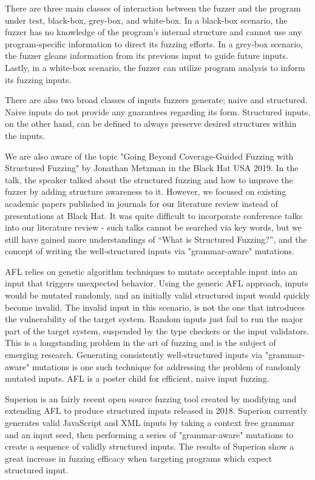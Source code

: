 \documentclass[12pt]{diazessay}
\begin{document}
There are three main classes of interaction between the fuzzer and the program under test, black-box\cite{takanen2018fuzzing}, grey-box, and white-box\cite{fuzzingsurvey}.
In a black-box scenario, the fuzzer has no knowledge of the program's internal structure and cannot use any program-specific information to direct its fuzzing efforts.
In a grey-box scenario, the fuzzer gleans information from its previous input to guide future inputs.
Lastly, in a white-box scenario, the fuzzer can utilize program analysis to inform its fuzzing inputs.

There are also two broad classes of inputs fuzzers generate; naive and structured\cite{fuzzingsurvey}.
Naive inputs do not provide any guarantees regarding its form.
Structured inputs, on the other hand, can be defined to always preserve desired structures within the inputs.

We are also aware of the topic "Going Beyond Coverage-Guided Fuzzing with Structured Fuzzing" by Jonathan Metzman in the Black Hat USA 2019\cite{blackhat2019}.
In the talk, the speaker talked about the structured fuzzing and how to improve the fuzzer by adding structure awareness to it. 
However, we focused on existing academic papers published in journals for our literature review instead of presentations at Black Hat.
It was quite difficult to incorporate conference talks into our literature review - such talks cannot be searched via key words, but we still have gained more understandings of “What is Structured Fuzzing?”, and the concept of writing the well-structured inputs via "grammar-aware" mutations.

AFL\cite{AFL_page} relies on genetic algorithm techniques\cite{InputMutationAlgorithm} to mutate acceptable input into an input that triggers unexpected behavior.
Using the generic AFL approach, inputs would be mutated randomly, and an initially valid structured input would quickly become invalid.
The invalid input in this scenario, is not the one that introduces the vulnerability of the target system.
Random inputs just fail to run the major part of the target system, suspended by the type checkers or the input validators.
This is a longstanding problem in the art of fuzzing and is the subject of emerging research.
Generating consistently well-structured inputs\cite{structuredInput} via "grammar-aware" mutations is one such technique for addressing the problem of randomly mutated inputs.
AFL is a poster child for efficient, naive input fuzzing.

Superion\cite{superion} is an fairly recent open source fuzzing tool created by modifying and extending AFL to produce structured inputs released in 2018.
Superion currently generates valid JavaScript and XML inputs by taking a context free grammar and an input seed, then performing a series of "grammar-aware" mutations to create a sequence of validly structured inputs.
The results of Superion show a great increase in fuzzing efficacy when targeting programs which expect structured input.
\end{document}
